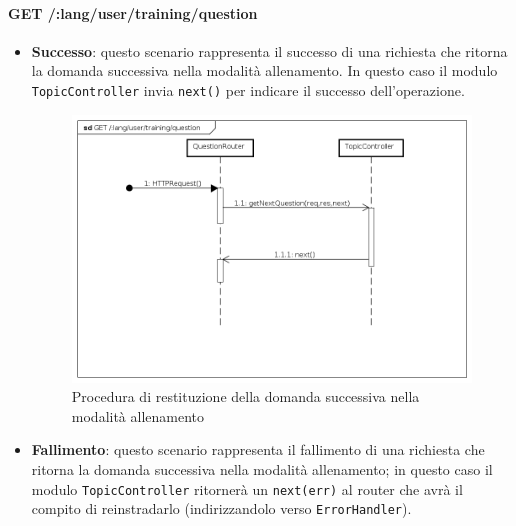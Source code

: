 \paragraph{GET /:lang/user/training/question} %
\begin{itemize}
\item \textbf{Successo}: questo scenario rappresenta il successo di una richiesta che ritorna la domanda successiva nella modalità allenamento. In questo caso il modulo \texttt{TopicController} invia \texttt{next()} per indicare il successo dell'operazione.

\begin{figure}[ht]
	\centering
	\includegraphics[scale=0.45]{UML/DiagrammiDiSequenza/Back-end/GET__lang_user_training_question_success.png}
	\caption{Procedura di restituzione della domanda successiva nella modalità allenamento}
\end{figure}
\FloatBarrier

\item \textbf{Fallimento}: questo scenario rappresenta il fallimento di una richiesta che ritorna la domanda successiva nella modalità allenamento; in questo caso il modulo \texttt{TopicController} ritornerà un \texttt{next(err)} al router che avrà il compito di reinstradarlo (indirizzandolo verso \texttt{ErrorHandler}).


\end{itemize}
